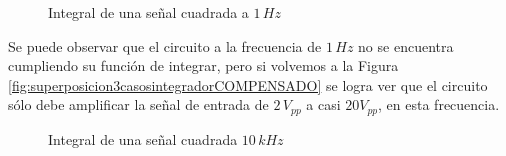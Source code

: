 \begin{figure}[H]
	\begin{center}
		\caption{Integral de una señal cuadrada a $1 \, Hz$}
		\label{fig:IntegralCOMP1Hz}
	\end{center}
\end{figure}

Se puede observar que el circuito a la frecuencia de $1 \, Hz$ no se encuentra cumpliendo su función de integrar, pero si volvemos a la Figura \ref{fig:superposicion3casosintegradorCOMPENSADO} se logra ver que el circuito sólo debe amplificar la señal de entrada de $2 \, V_{pp}$ a casi $20 V_{pp}$, en esta frecuencia.

\begin{figure}[H]
	\begin{center}
		\caption{Integral de una señal cuadrada $10 \, kHz$}
		\label{fig:IntegralCOMP10kHz}
	\end{center}
\end{figure}

